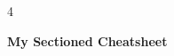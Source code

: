\documentclass[8pt,landscape]{extarticle}
\begin{document}
\begin{multicols*}{4}

{\large \textbf{My Sectioned Cheatsheet}} 
\vspace{0.1in}



\end{multicols*}
\end{document}
